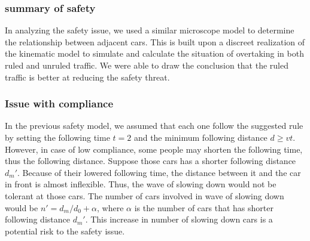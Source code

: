 \subsubsection{summary of safety}

In analyzing the safety issue, we used a similar microscope model to determine the relationship between adjacent cars. This is built upon a discreet realization of the kinematic model to simulate and calculate the situation of overtaking in both ruled and unruled traffic. We were able to draw the conclusion that the ruled traffic is better at reducing the safety threat.

\subsubsection{Issue with compliance}

In the previous safety model, we assumed that each one follow the suggested rule by setting the following time $t = 2$ and  the minimum following distance $d \ge vt$. However, in case of low compliance, some people may shorten the following time, thus the following distance. Suppose those cars has a shorter following distance $d_m'$. Because of their lowered following time, the distance between it and the car in front is almost inflexible. Thus, the wave of slowing down would not be tolerant at those cars. The number of cars involved in wave of slowing down would be $n' = d_m/d_0+\alpha$, where $\alpha$ is the number of cars that has shorter following distance $d_m'$. This increase in number of slowing down cars is a potential risk to the safety issue. 